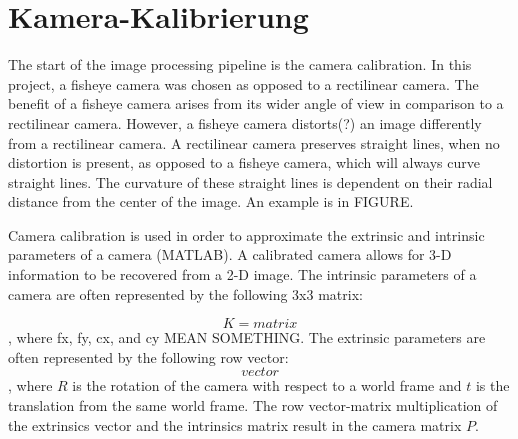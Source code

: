 \documentclass[arbeit=studie,oneside,BCOR=12mm]{ArbeitRST}
\begin{document}
\section{Kamera-Kalibrierung}
The start of the image processing pipeline is the camera calibration. In this 
project, a fisheye camera was chosen as opposed to a rectilinear camera. The 
benefit of a 
fisheye camera arises from its wider angle of view in comparison to a 
rectilinear camera. However, a fisheye camera distorts(?) an image differently 
from a rectilinear 
camera. A rectilinear camera preserves straight lines, when no distortion is 
present, as opposed to a fisheye camera, which will always curve straight lines. 
The 
curvature of these straight lines is dependent on their radial distance from 
the center of the image.  An example is in FIGURE.

Camera calibration is used in order to approximate the extrinsic and intrinsic 
parameters of a camera (MATLAB). A calibrated camera allows for 3-D information
to be recovered from a 2-D image. The intrinsic parameters of a camera are often 
represented by the following 3x3 matrix:

$$K = matrix$$, where fx, fy, cx, and cy MEAN SOMETHING. The extrinsic
parameters are often represented by the following row vector:
$$vector$$, where $R$ is the rotation of the camera with respect to a world 
frame and $t$ is the translation from the same world frame. The row 
vector-matrix multiplication of the extrinsics vector and the intrinsics matrix
result in the camera matrix $P$.
\end{document}
